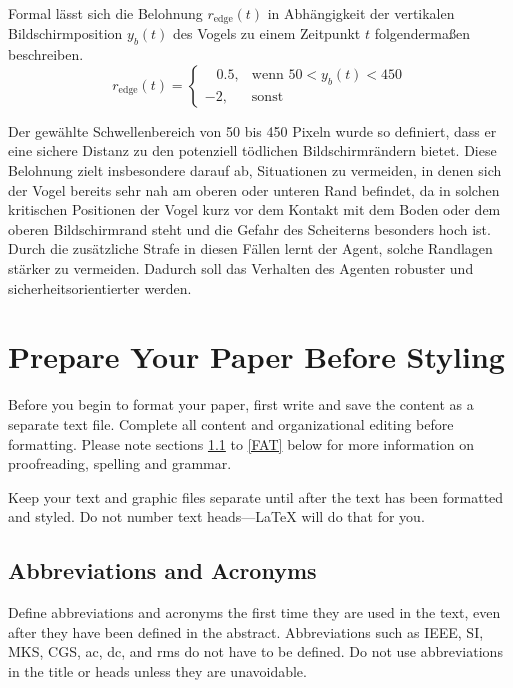 \documentclass[conference]{IEEEtran}
\begin{document}
Formal lässt sich die Belohnung \( r_{\text{edge}}(t) \) in Abhängigkeit der vertikalen Bildschirmposition \( y_b(t) \) des Vogels zu einem Zeitpunkt \( t \) folgendermaßen beschreiben.
\begin{equation}
	r_{\text{edge}}(t) =
	\begin{cases}
		\;\;\;0{.}5, & \text{wenn } 50 < y_b(t) < 450 \\
		-2, & \text{sonst}
	\end{cases}
\end{equation}

Der gewählte Schwellenbereich von 50 bis 450 Pixeln wurde so definiert, dass er eine sichere Distanz zu den potenziell tödlichen Bildschirmrändern bietet. Diese Belohnung zielt insbesondere darauf ab, Situationen zu vermeiden, in denen sich der Vogel bereits sehr nah am oberen oder unteren Rand befindet, da in solchen kritischen Positionen der Vogel kurz vor dem Kontakt mit dem Boden oder dem oberen Bildschirmrand steht und die Gefahr des Scheiterns besonders hoch ist. Durch die zusätzliche Strafe in diesen Fällen lernt der Agent, solche Randlagen stärker zu vermeiden. Dadurch soll das Verhalten des Agenten robuster und sicherheitsorientierter werden.

\section{Prepare Your Paper Before Styling}
Before you begin to format your paper, first write and save the content as a 
separate text file. Complete all content and organizational editing before 
formatting. Please note sections \ref{AA} to \ref{FAT} below for more information on 
proofreading, spelling and grammar.

Keep your text and graphic files separate until after the text has been 
formatted and styled. Do not number text heads---{\LaTeX} will do that 
for you.

\subsection{Abbreviations and Acronyms}\label{AA}
Define abbreviations and acronyms the first time they are used in the text, 
even after they have been defined in the abstract. Abbreviations such as 
IEEE, SI, MKS, CGS, ac, dc, and rms do not have to be defined. Do not use 
abbreviations in the title or heads unless they are unavoidable.
\end{document}
